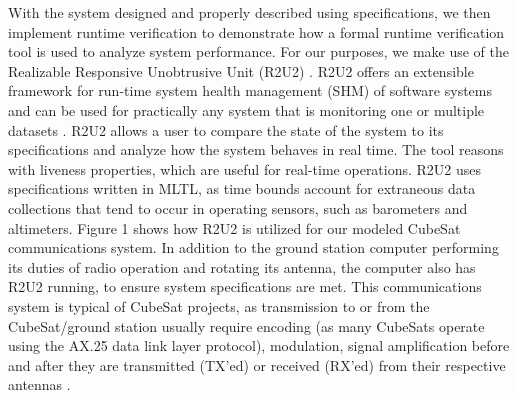 \documentclass[conf]{new-aiaa}
\begin{document}
With the system designed and properly described using specifications, we then implement runtime verification to demonstrate how a formal runtime verification tool is used to analyze system performance. For our purposes, we make use of the Realizable Responsive Unobtrusive Unit (R2U2) \cite{RS17}. R2U2 offers an extensible framework for run-time system health management (SHM) of software systems and can be used for practically any system that is monitoring one or multiple datasets \cite{MRS17,RS17}. R2U2 allows a user to compare the state of the system to its specifications and analyze how the system behaves in real time. The tool reasons with liveness properties, which are useful for real-time operations. R2U2 uses specifications written in MLTL, as time bounds account for extraneous data collections that tend to occur in operating sensors, such as barometers and altimeters. Figure 1 shows how R2U2 is utilized for our modeled CubeSat communications system. In addition to the ground station computer performing its duties of radio operation and rotating its antenna, the computer also has R2U2 running, to ensure system specifications are met. This communications system is typical of CubeSat projects, as transmission to or from the CubeSat/ground station usually require encoding (as many CubeSats operate using the AX.25 data link layer protocol), modulation, signal amplification before and after they are transmitted (TX'ed) or received (RX'ed) from their respective antennas \cite{Asundi2013}.\\


\end{document}

